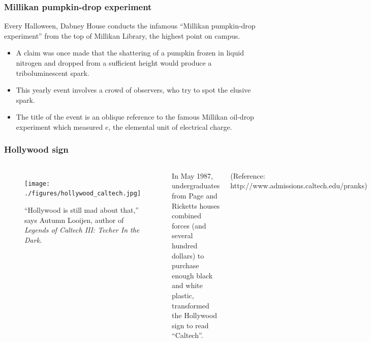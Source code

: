 \documentclass[hyperref={bookmarks=false},aspectratio=169]{beamer}
\begin{document}
\begin{frame}
\frametitle{Millikan pumpkin-drop experiment}
Every Halloween, Dabney House conducts the infamous ``Millikan pumpkin-drop experiment'' from the top of Millikan Library, the highest point on campus.

\begin{itemize}
    \item A claim was once made that the shattering of a pumpkin frozen in liquid nitrogen and dropped from a sufficient height would produce a triboluminescent spark. 
    \item This yearly event involves a crowd of observers, who try to spot the elusive spark.
    \item The title of the event is an oblique reference to the famous Millikan oil-drop experiment which measured $e$, the elemental unit of electrical charge.
\end{itemize}

\end{frame}

\begin{frame}
\frametitle{Hollywood sign}

\begin{columns}


\begin{figure}
    \centering
    \texttt{[image: ./figures/hollywood\_caltech.jpg]}
    \caption{``Hollywood is still mad about that,'' says Autumn Looijen, author of \emph{Legends of Caltech III: Techer In the Dark.} }
    \label{fig:hollywood_prank}
\end{figure}


In May 1987, undergraduates from Page and Ricketts houses combined forces (and several hundred dollars) to purchase enough black and white plastic, transformed the Hollywood sign to read ``Caltech''.

\small{(Reference: http://www.admissions.caltech.edu/pranks)}

\end{columns}
\end{frame}
\end{document}
